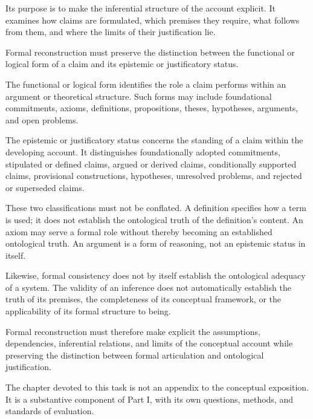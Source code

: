 Its purpose is to make the inferential structure of the
account explicit. It examines how claims are formulated,
which premises they require, what follows from them,
and where the limits of their justification lie.

Formal reconstruction must preserve the distinction
between the functional or logical form of a claim and
its epistemic or justificatory status.

The functional or logical form identifies the role
a claim performs within an argument or theoretical
structure. Such forms may include foundational
commitments, axioms, definitions, propositions, theses,
hypotheses, arguments, and open problems.

The epistemic or justificatory status concerns the
standing of a claim within the developing account.
It distinguishes foundationally adopted commitments,
stipulated or defined claims, argued or derived claims,
conditionally supported claims, provisional constructions,
hypotheses, unresolved problems, and rejected or
superseded claims.

These two classifications must not be conflated.
A definition specifies how a term is used; it does
not establish the ontological truth of the definition's
content. An axiom may serve a formal role without
thereby becoming an established ontological truth.
An argument is a form of reasoning, not an epistemic
status in itself.

Likewise, formal consistency does not by itself
establish the ontological adequacy of a system.
The validity of an inference does not automatically
establish the truth of its premises, the completeness
of its conceptual framework, or the applicability
of its formal structure to being.

Formal reconstruction must therefore make explicit
the assumptions, dependencies, inferential relations,
and limits of the conceptual account while preserving
the distinction between formal articulation and
ontological justification.

The chapter devoted to this task is not an appendix
to the conceptual exposition. It is a substantive
component of Part I, with its own questions, methods,
and standards of evaluation.






